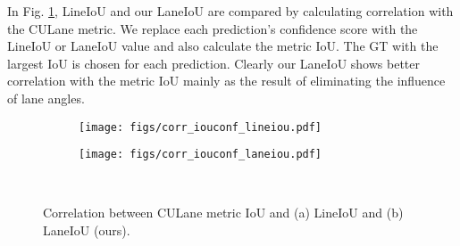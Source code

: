 \documentclass[10pt,twocolumn,letterpaper]{article}
\begin{document}
In Fig. \ref{fig:correlation}, LineIoU \cite{Zheng_2022_CVPR} and our LaneIoU are compared by calculating correlation with the CULane metric.
We replace each prediction's confidence score with the LineIoU or LaneIoU value and also calculate the metric IoU. The GT with the largest IoU is chosen for each prediction.
Clearly our LaneIoU shows better correlation with the metric IoU mainly as the result of eliminating the influence of lane angles.


\begin{figure}[htb]
\centering
  \begin{subfigure}[b]{.495\linewidth}
    \centering
    \texttt{[image: figs/corr\_iouconf\_lineiou.pdf]}
    \caption{}
  \end{subfigure}
  \begin{subfigure}[b]{.495\linewidth}
    \centering
    \texttt{[image: figs/corr\_iouconf\_laneiou.pdf]}
    \caption{}
  \end{subfigure}\\\caption{Correlation between CULane metric IoU and (a) LineIoU \cite{Zheng_2022_CVPR} and (b) LaneIoU (ours).}
\label{fig:correlation}
\end{figure}
\end{document}
